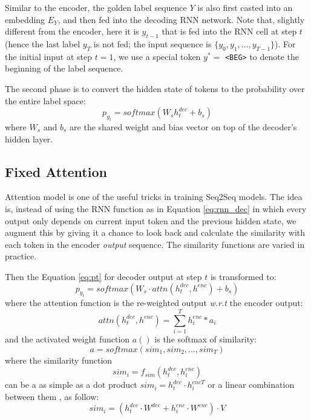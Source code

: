 \documentclass[11pt,a4paper]{article}
\begin{document}
Similar to the encoder, the golden label sequence $Y$ is also first casted into an embedding $E_Y$, and then fed into the decoding RNN network. Note that, slightly different from the encoder, here it is $y_{t-1}$ that is fed into the RNN cell at step $t$ (hence the last label $y_{T}$ is not fed; the input sequence is $\{y_0, y_1, \dots, y_{T-1}\}$). For the initial input at step $t = 1$, we use a special token $y^* =$ \texttt{<BEG>} to denote the beginning of the label sequence.

The second phase is to convert the hidden state of tokens to the probability over the entire label space: 
  \begin{equation}
      p_{y_t} = softmax(W_{s} h^{dec}_t + b_{s}) \label{eq:pt}
  \end{equation}
where $W_{s}$ and $b_{s}$ are the shared weight and bias vector on top of the decoder's hidden layer. 

\subsection{Fixed Attention}
Attention model \cite{bahdanau2014neural,luong2015effective} is one of the useful tricks in training Seq2Seq models. The idea is, instead of using the RNN function as in Equation \ref{eq:rnn_dec} in which every output only depends on current input token and the previous hidden state, we augment this by giving it a chance to look back and calculate the similarity with each token in the encoder \textit{output} sequence. The similarity functions are varied in practice. 

Then the Equation \ref{eq:pt} for decoder output at step $t$ is transformed to: 
  \begin{equation}
      p_{y_t} = softmax(W_{s} \cdot attn(h^{dec}_t, h^{enc}) + b_{s}) \label{eq:pt_attn}
  \end{equation}
where the attention function is the re-weighted output \textit{w.r.t} the encoder output: 
  \begin{equation}
	  attn(h^{dec}_t, h^{enc}) = \sum^{T}_{i=1} h^{enc}_i * a_i \label{eq:attn}
  \end{equation}
and the activated weight function $a()$ is the softmax of similarity: 
  \begin{equation}
	  a = softmax(sim_1, sim_2, \dots, sim_T) \label{eq:a}
  \end{equation}
where the similarity function
  \begin{equation}
	sim_i = f_{sim}(h^{dec}_t, h^{enc}_i)
  \end{equation}
can be a as simple as a dot product $sim_i = h^{dec}_t \cdot h^{encT}_i $ \cite{luong2015effective} or a linear combination between them \cite{bahdanau2014neural}, as follow:  
  \begin{equation}
  	sim_i = (h^{dec}_t \cdot W^{dec} + h^{enc}_i \cdot W^{enc}) \cdot V
  \end{equation}
  
\end{document}
